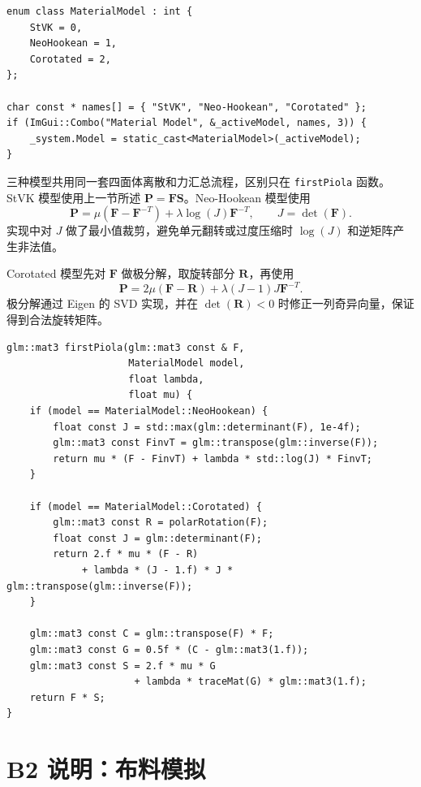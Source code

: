 \documentclass[UTF8,a4paper,11pt,fontset=fandol]{ctexart}
\begin{document}
\begin{lstlisting}[style=cppstyle,caption={材料模型枚举与 UI 选择}]
enum class MaterialModel : int {
    StVK = 0,
    NeoHookean = 1,
    Corotated = 2,
};

char const * names[] = { "StVK", "Neo-Hookean", "Corotated" };
if (ImGui::Combo("Material Model", &_activeModel, names, 3)) {
    _system.Model = static_cast<MaterialModel>(_activeModel);
}
\end{lstlisting}

三种模型共用同一套四面体离散和力汇总流程，区别只在 \texttt{firstPiola} 函数。StVK 模型使用上一节所述
$\mathbf{P}=\mathbf{F}\mathbf{S}$。Neo-Hookean 模型使用
\[
\mathbf{P}
= \mu(\mathbf{F}-\mathbf{F}^{-T})
  + \lambda \log(J)\mathbf{F}^{-T},
\qquad J=\det(\mathbf{F}).
\]
实现中对 $J$ 做了最小值裁剪，避免单元翻转或过度压缩时 $\log(J)$ 和逆矩阵产生非法值。

Corotated 模型先对 $\mathbf{F}$ 做极分解，取旋转部分 $\mathbf{R}$，再使用
\[
\mathbf{P}
= 2\mu(\mathbf{F}-\mathbf{R})
  + \lambda (J-1)J\mathbf{F}^{-T}.
\]
极分解通过 Eigen 的 SVD 实现，并在 $\det(\mathbf{R})<0$ 时修正一列奇异向量，保证得到合法旋转矩阵。

\begin{lstlisting}[style=cppstyle,caption={三种材料模型的 First Piola stress}]
glm::mat3 firstPiola(glm::mat3 const & F,
                     MaterialModel model,
                     float lambda,
                     float mu) {
    if (model == MaterialModel::NeoHookean) {
        float const J = std::max(glm::determinant(F), 1e-4f);
        glm::mat3 const FinvT = glm::transpose(glm::inverse(F));
        return mu * (F - FinvT) + lambda * std::log(J) * FinvT;
    }

    if (model == MaterialModel::Corotated) {
        glm::mat3 const R = polarRotation(F);
        float const J = glm::determinant(F);
        return 2.f * mu * (F - R)
             + lambda * (J - 1.f) * J * glm::transpose(glm::inverse(F));
    }

    glm::mat3 const C = glm::transpose(F) * F;
    glm::mat3 const G = 0.5f * (C - glm::mat3(1.f));
    glm::mat3 const S = 2.f * mu * G
                      + lambda * traceMat(G) * glm::mat3(1.f);
    return F * S;
}
\end{lstlisting}

\section{B2 说明：布料模拟}
\end{document}
